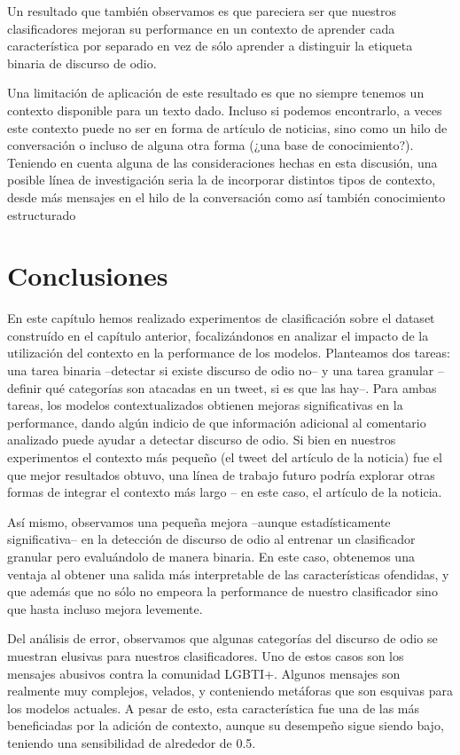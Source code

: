 Un resultado que también observamos es que pareciera ser que nuestros clasificadores mejoran su performance en un contexto de aprender cada característica por separado en vez de sólo aprender a distinguir la etiqueta binaria de discurso de odio.

Una limitación de aplicación de este resultado es que no siempre tenemos un contexto disponible para un texto dado. Incluso si podemos encontrarlo, a veces este contexto puede no ser en forma de artículo de noticias, sino como un hilo de conversación o incluso de alguna otra forma (¿una base de conocimiento?). Teniendo en cuenta alguna de las consideraciones hechas en esta discusión, una posible línea de investigación seria la de incorporar distintos tipos de contexto, desde más mensajes en el hilo de la conversación como así también conocimiento estructurado 

\section{Conclusiones}

En este capítulo hemos realizado experimentos de clasificación sobre el dataset construído en el capítulo anterior, focalizándonos en analizar el impacto de la utilización del contexto en la performance de los modelos. Planteamos dos tareas: una tarea binaria --detectar si existe discurso de odio no-- y una tarea granular --definir qué categorías son atacadas en un tweet, si es que las hay--. Para ambas tareas, los modelos contextualizados obtienen mejoras significativas en la performance, dando algún indicio de que información adicional al comentario analizado puede ayudar a detectar discurso de odio. Si bien en nuestros experimentos el contexto más pequeño (el tweet del artículo de la noticia) fue el que mejor resultados obtuvo, una línea de trabajo futuro podría explorar otras formas de integrar el contexto más largo -- en este caso, el artículo de la noticia.

Así mismo, observamos una pequeña mejora --aunque estadísticamente significativa-- en la detección de discurso de odio al entrenar un clasificador granular pero evaluándolo de manera binaria. En este caso, obtenemos una ventaja al obtener una salida más interpretable de las características ofendidas, y que además que no sólo no empeora la performance de nuestro clasificador sino que hasta incluso mejora levemente.

Del análisis de error, observamos que algunas categorías del discurso de odio se muestran elusivas para nuestros clasificadores. Uno de estos casos son los mensajes abusivos contra la comunidad LGBTI+. Algunos mensajes son realmente muy complejos, velados, y conteniendo metáforas que son esquivas para los modelos actuales. A pesar de esto, esta característica fue una de las más beneficiadas por la adición de contexto, aunque su desempeño sigue siendo bajo, teniendo una sensibilidad de alrededor de 0.5. 

